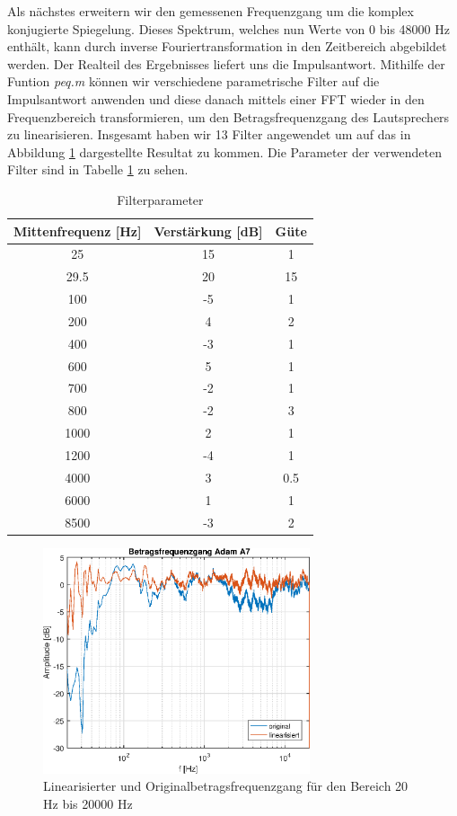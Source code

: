 Als nächstes erweitern wir den gemessenen Frequenzgang um die komplex konjugierte Spiegelung. 
Dieses Spektrum, welches nun Werte von 0 bis 48000 Hz enthält, kann durch inverse Fouriertransformation in den Zeitbereich abgebildet werden.
Der Realteil des Ergebnisses liefert uns die Impulsantwort.
Mithilfe der Funtion \textit{peq.m} können wir verschiedene parametrische Filter auf die Impulsantwort anwenden und diese danach mittels einer FFT wieder in den Frequenzbereich transformieren, um den Betragsfrequenzgang des Lautsprechers zu linearisieren.
Insgesamt haben wir 13 Filter angewendet um auf das in Abbildung \ref{fig:frequenzgangA7_lin} dargestellte Resultat zu kommen.
Die Parameter der verwendeten Filter sind in Tabelle \ref{tab:filterparameter} zu sehen.

\begin{table}[H]
    \centering
    \caption{Filterparameter}
    \label{tab:filterparameter}
    \begin{tabular}{| c |c |c |}
    	\hline
        Mittenfrequenz [Hz] & Verstärkung [dB] & Güte\\
        \hline
        25 & 15 & 1 \\
		29.5 & 20 & 15 \\
		100 & -5 & 1\\
		200 & 4 & 2\\
		400 & -3 & 1 \\
		600 & 5 & 1\\
		700 &-2 & 1 \\
		800 & -2 & 3\\
		1000 & 2 & 1\\
		1200 & -4 & 1\\
		4000 & 3 & 0.5\\
		6000 & 1 & 1\\
		8500 & -3 & 2\\
        \hline
    \end{tabular}
\end{table}

\begin{figure}[H]
        \centering
        \includegraphics[width=0.7\textwidth]{Figures/frequenzgangA7_lin.eps}
        \caption{Linearisierter und Originalbetragsfrequenzgang für den Bereich 20 Hz bis 20000 Hz}
        \label{fig:frequenzgangA7_lin}
\end{figure}




